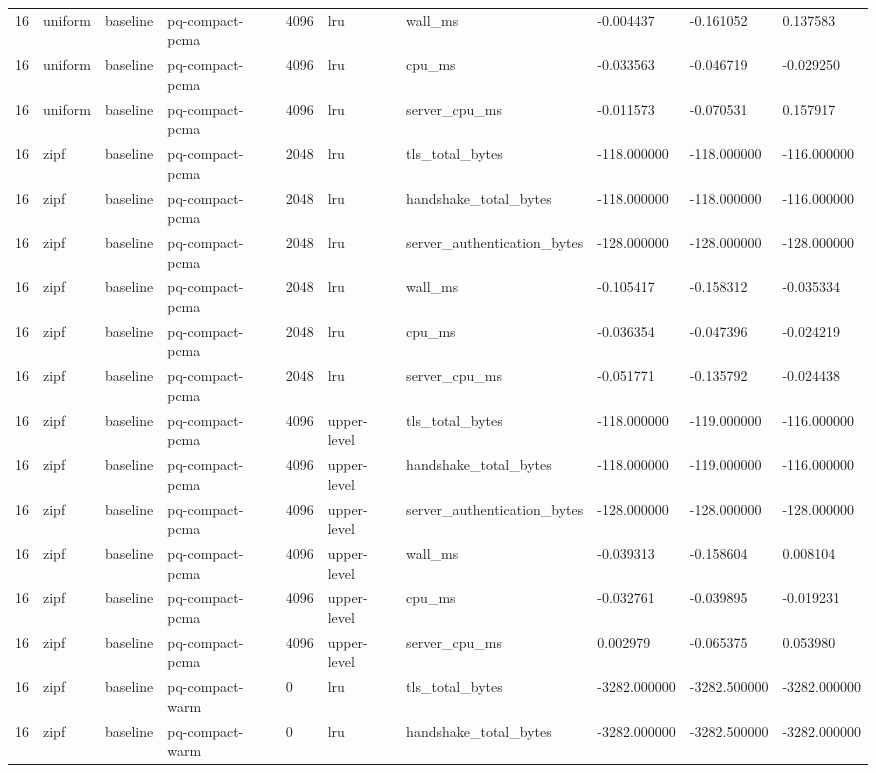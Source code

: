 \begin{tabular}{llllllllll}
16 & uniform & baseline & pq-compact-pcma & 4096 & lru & wall\_ms & -0.004437 & -0.161052 & 0.137583 \\
16 & uniform & baseline & pq-compact-pcma & 4096 & lru & cpu\_ms & -0.033563 & -0.046719 & -0.029250 \\
16 & uniform & baseline & pq-compact-pcma & 4096 & lru & server\_cpu\_ms & -0.011573 & -0.070531 & 0.157917 \\
16 & zipf & baseline & pq-compact-pcma & 2048 & lru & tls\_total\_bytes & -118.000000 & -118.000000 & -116.000000 \\
16 & zipf & baseline & pq-compact-pcma & 2048 & lru & handshake\_total\_bytes & -118.000000 & -118.000000 & -116.000000 \\
16 & zipf & baseline & pq-compact-pcma & 2048 & lru & server\_authentication\_bytes & -128.000000 & -128.000000 & -128.000000 \\
16 & zipf & baseline & pq-compact-pcma & 2048 & lru & wall\_ms & -0.105417 & -0.158312 & -0.035334 \\
16 & zipf & baseline & pq-compact-pcma & 2048 & lru & cpu\_ms & -0.036354 & -0.047396 & -0.024219 \\
16 & zipf & baseline & pq-compact-pcma & 2048 & lru & server\_cpu\_ms & -0.051771 & -0.135792 & -0.024438 \\
16 & zipf & baseline & pq-compact-pcma & 4096 & upper-level & tls\_total\_bytes & -118.000000 & -119.000000 & -116.000000 \\
16 & zipf & baseline & pq-compact-pcma & 4096 & upper-level & handshake\_total\_bytes & -118.000000 & -119.000000 & -116.000000 \\
16 & zipf & baseline & pq-compact-pcma & 4096 & upper-level & server\_authentication\_bytes & -128.000000 & -128.000000 & -128.000000 \\
16 & zipf & baseline & pq-compact-pcma & 4096 & upper-level & wall\_ms & -0.039313 & -0.158604 & 0.008104 \\
16 & zipf & baseline & pq-compact-pcma & 4096 & upper-level & cpu\_ms & -0.032761 & -0.039895 & -0.019231 \\
16 & zipf & baseline & pq-compact-pcma & 4096 & upper-level & server\_cpu\_ms & 0.002979 & -0.065375 & 0.053980 \\
16 & zipf & baseline & pq-compact-warm & 0 & lru & tls\_total\_bytes & -3282.000000 & -3282.500000 & -3282.000000 \\
16 & zipf & baseline & pq-compact-warm & 0 & lru & handshake\_total\_bytes & -3282.000000 & -3282.500000 & -3282.000000 \\

\end{tabular}

